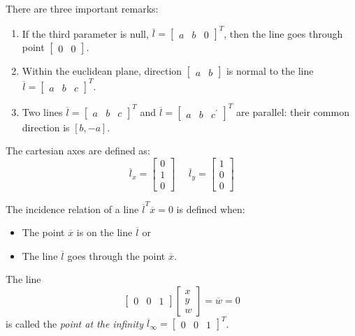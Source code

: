 \documentclass[12pt, a4paper]{report}
\newtheorem[style=M,bodystyle=\normalfont]{theorem}{Theorem}
\newtheorem[style=M,bodystyle=\normalfont]{corollary}{Corollary}
\newtheorem[style=M,bodystyle=\normalfont]{lemma}{Lemma}
\newtheorem[style=M,bodystyle=\normalfont]{definition}{Definition}
\begin{document}
    There are three important remarks: 
    \begin{enumerate}
        \item If the third parameter is null, ${\overline{l}=\begin{bmatrix} a & b & 0 \end{bmatrix}}^T$, then the line goes through point $\begin{bmatrix} 0 & 0 \end{bmatrix}$. 
        \item Within the euclidean plane, direction $\begin{bmatrix} a & b \end{bmatrix}$ is normal to the line \\ ${\overline{l}=\begin{bmatrix} a & b & c \end{bmatrix}}^T$. 
        \item Two lines ${\overline{l}=\begin{bmatrix} a & b & c \end{bmatrix}}^T$ and ${\overline{l}=\begin{bmatrix} a & b & c^{'} \end{bmatrix}}^T$ are parallel: their common 
            direction is $[b,-a]$. 
    \end{enumerate}
    \begin{example}
        The cartesian axes are defined as: 
        \[\overline{l}_x=\begin{bmatrix} 0 \\ 1 \\ 0 \end{bmatrix} \:\:\:\:\:\: \overline{l}_y=\begin{bmatrix} 1 \\ 0 \\ 0 \end{bmatrix}\]
    \end{example}
    The incidence relation of a line $\overline{l}^T\overline{x}=0$ is defined when: 
    \begin{itemize}
        \item The point $\overline{x}$ is on the line $\overline{l}$ or
        \item The line $\overline{l}$ goes through the point $\overline{x}$. 
    \end{itemize}
    \begin{definition}
        The line \[\begin{bmatrix} 0 & 0 & 1 \end{bmatrix} \begin{bmatrix} x \\ y \\ w \end{bmatrix}=\overline{w}=0\] is called the \emph{point at the infinity} $\overline{l}_{\infty}={\begin{bmatrix} 0 & 0 & 1 \end{bmatrix}}^T$. 
    \end{definition}
\end{document}

